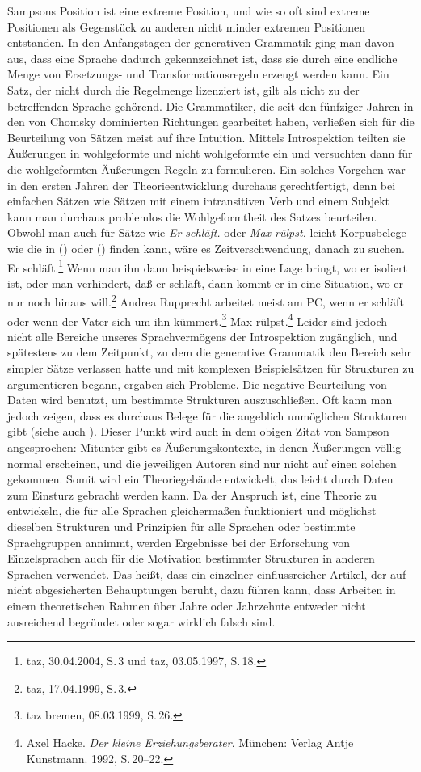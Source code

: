 Sampsons Position ist eine extreme Position, und wie so oft sind extreme Positionen als Gegenstück
zu anderen nicht minder extremen Positionen entstanden. In den Anfangstagen der generativen Grammatik ging man davon aus,
dass eine Sprache dadurch gekennzeichnet ist, dass sie durch eine endliche Menge von Ersetzungs- und
Transformationsregeln erzeugt werden kann. Ein Satz, der nicht durch die Regelmenge lizenziert ist,
gilt als nicht zu der betreffenden Sprache gehörend. Die Grammatiker, die
seit den fünfziger Jahren in den von Chomsky dominierten Richtungen gearbeitet haben, verließen
sich für die Beurteilung von Sätzen meist auf ihre Intuition. Mittels Introspektion teilten sie
Äußerungen in wohlgeformte und nicht wohlgeformte ein und versuchten dann für die wohlgeformten
Äußerungen Regeln zu formulieren. Ein solches Vorgehen war in den ersten Jahren der Theorieentwicklung
durchaus gerechtfertigt, denn bei einfachen Sätzen wie \zb Sätzen mit einem intransitiven Verb
und einem Subjekt kann man durchaus problemlos die Wohlgeformtheit des Satzes beurteilen.
Obwohl man auch für Sätze wie \emph{Er schläft.} oder \emph{Max rülpst.} leicht Korpusbelege
wie die in () oder () finden kann, wäre es Zeitverschwendung, danach zu suchen.
\eal
\ex Er schläft.\footnote{
  taz, 30.04.2004, S.\,3 und taz, 03.05.1997, S.\,18.
}
\ex Wenn man ihn dann beispielsweise in eine Lage bringt, wo er isoliert ist, oder man verhindert, 
    daß er schläft, dann kommt er in eine Situation, wo er nur noch hinaus will.\footnote{
  taz, 17.04.1999, S.\,3.
}
\ex Andrea Rupprecht arbeitet meist am PC, wenn er schläft oder wenn der Vater sich um ihn kümmert.\footnote{
  taz bremen,  08.03.1999, S.\,26.
}
\zl
\ea
Max rülpst.\footnote{
  Axel Hacke. \emph{Der kleine Erziehungsberater}. München: Verlag Antje Kunstmann. 1992, S.\,20--22.%
}
\z
Leider sind jedoch nicht alle Bereiche unseres Sprachvermögens der Introspektion zugänglich, und
spätestens zu dem Zeitpunkt, zu dem die generative Grammatik den Bereich sehr simpler Sätze verlassen
hatte und mit komplexen Beispielsätzen für Strukturen zu argumentieren begann, ergaben sich Probleme.
Die negative Beurteilung von Daten wird benutzt, um bestimmte Strukturen auszuschließen. Oft kann man
jedoch zeigen, dass es durchaus Belege für die angeblich unmöglichen Strukturen gibt (siehe auch ).
Dieser Punkt wird auch in dem obigen Zitat von Sampson angesprochen: Mitunter gibt es Äußerungskontexte, in denen
Äußerungen völlig normal erscheinen, und die jeweiligen Autoren sind nur nicht auf einen solchen gekommen.
Somit wird ein Theoriegebäude entwickelt, das leicht durch Daten zum Einsturz gebracht werden kann.
Da der Anspruch ist, eine Theorie zu entwickeln, die für alle Sprachen gleichermaßen funktioniert
und möglichst dieselben Strukturen und Prinzipien für alle Sprachen oder bestimmte Sprachgruppen
annimmt, werden Ergebnisse bei der Erforschung von Einzelsprachen auch für die Motivation
bestimmter Strukturen in anderen Sprachen verwendet. Das heißt, dass ein einzelner einflussreicher
Artikel, der auf nicht abgesicherten Behauptungen beruht, dazu führen kann, dass Arbeiten
in einem theoretischen Rahmen über Jahre oder Jahrzehnte entweder nicht ausreichend begründet 
oder sogar wirklich falsch sind.

